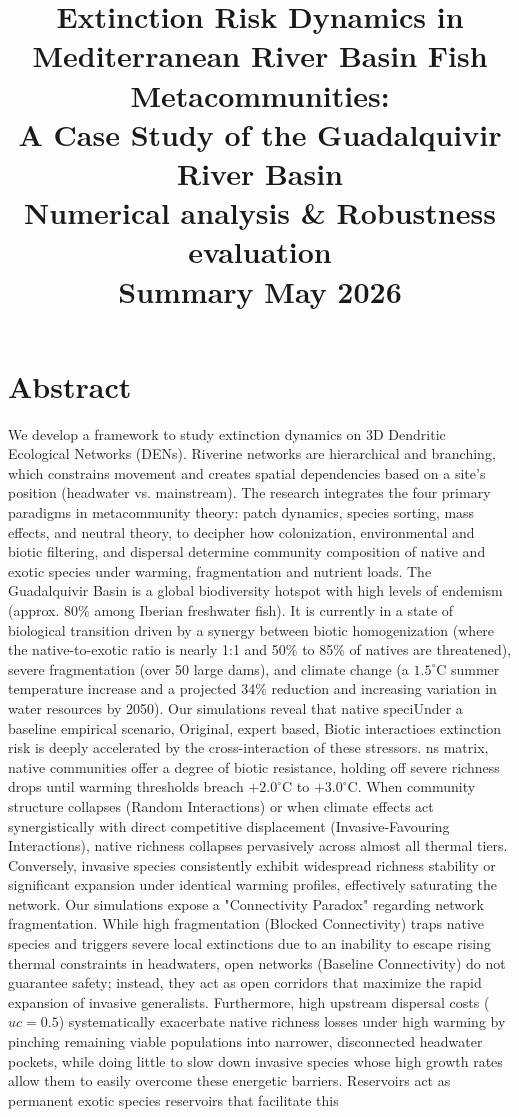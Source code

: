 \documentclass[11pt,a4paper]{article}
\title{\textbf{Extinction Risk Dynamics in Mediterranean River Basin Fish Metacommunities: \\A Case Study of the Guadalquivir River Basin \\ 
\vspace{0.2 in}
Numerical analysis \& Robustness evaluation
\\
Summary May 2026}}
\author{}
\date{}
\begin{document}
\maketitle

\newpage

\tableofcontents
\printindex

\newpage

\section{Abstract}
We develop a framework to study extinction dynamics on 3D Dendritic Ecological Networks (DENs). Riverine networks are hierarchical and branching, which constrains movement and creates spatial dependencies based on a site’s position (headwater vs. mainstream). The research integrates the four primary paradigms in metacommunity theory: patch dynamics, species sorting, mass effects, and neutral theory, to decipher how colonization, environmental and biotic filtering, and dispersal determine community composition of native and exotic species under warming, fragmentation and nutrient loads. The Guadalquivir Basin is a global biodiversity hotspot with high levels of endemism (approx. 80$\%$ among Iberian freshwater fish). It is currently in a state of biological transition driven by a synergy between biotic homogenization (where the native-to-exotic ratio is nearly 1:1 and 50$\%$ to 85$\%$ of natives are threatened), severe fragmentation (over 50 large dams), and climate change (a $1.5^{\circ}\text{C}$ summer temperature increase and a projected 34$\%$ reduction and increasing variation in water resources by 2050). Our simulations reveal that native speciUnder a baseline empirical scenario, Original, expert based, Biotic interactioes extinction risk is deeply accelerated by the cross-interaction of these stressors. ns matrix, native communities offer a degree of biotic resistance, holding off severe richness drops until warming thresholds breach $+2.0^{\circ}\text{C}$ to $+3.0^{\circ}\text{C}$. When community structure collapses (Random Interactions) or when climate effects act synergistically with direct competitive displacement (Invasive-Favouring Interactions), native richness collapses pervasively across almost all thermal tiers. Conversely, invasive species consistently exhibit widespread richness stability or significant expansion under identical warming profiles, effectively saturating the network. Our simulations expose a "Connectivity Paradox" regarding network fragmentation. While high fragmentation (Blocked Connectivity) traps native species and triggers severe local extinctions due to an inability to escape rising thermal constraints in headwaters, open networks (Baseline Connectivity) do not guarantee safety; instead, they act as open corridors that maximize the rapid expansion of invasive generalists. Furthermore, high upstream dispersal costs ($uc = 0.5$) systematically exacerbate native richness losses under high warming by pinching remaining viable populations into narrower, disconnected headwater pockets, while doing little to slow down invasive species whose high growth rates allow them to easily overcome these energetic barriers. Reservoirs act as permanent exotic species reservoirs that facilitate this 
\end{document}
